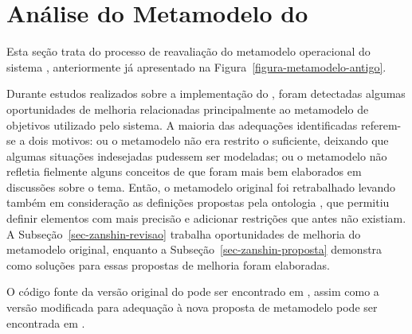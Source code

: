 
\chapter{Análise do Metamodelo do \zanshin}
\label{sec-zanshin}

Esta seção trata do processo de reavaliação do metamodelo operacional do sistema \zanshin, anteriormente já apresentado na Figura~\ref{figura-metamodelo-antigo}.


Durante estudos realizados sobre a implementação do \framework \zanshin, foram detectadas algumas oportunidades de melhoria relacionadas principalmente ao metamodelo de objetivos utilizado pelo sistema. A maioria das adequações identificadas referem-se a dois motivos: ou o metamodelo não era restrito o suficiente, deixando que algumas situações indesejadas pudessem ser modeladas; ou o metamodelo não refletia fielmente alguns conceitos de \gore que foram mais bem elaborados em discussões sobre o tema. Então, o metamodelo original foi retrabalhado levando também em consideração as definições propostas pela ontologia \goro, que permitiu definir elementos com mais precisão e adicionar restrições que antes não existiam. A Subseção~\ref{sec-zanshin-revisao} trabalha oportunidades de melhoria do metamodelo original, enquanto a Subseção~\ref{sec-zanshin-proposta} demonstra como soluções para essas propostas de melhoria foram elaboradas.

O código fonte da versão original do \zanshin pode ser encontrado em \codigoZanshin, assim como a versão modificada para adequação à nova proposta de metamodelo pode ser encontrada em \novocodigoZanshin.


